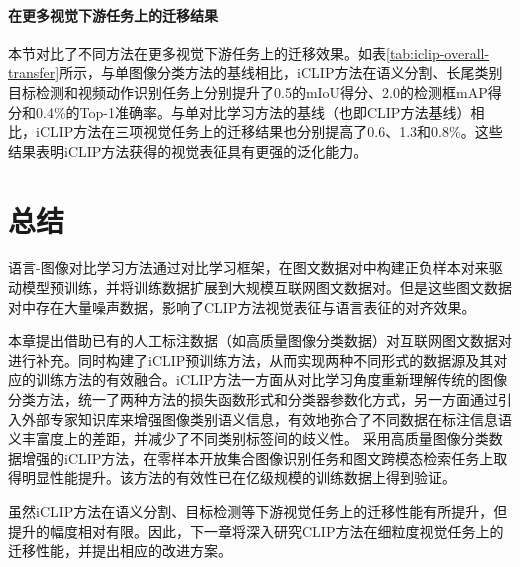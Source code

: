 \paragraph{在更多视觉下游任务上的迁移结果} 本节对比了不同方法在更多视觉下游任务上的迁移效果。如表\ref{tab:iclip-overall-transfer}所示，与单图像分类方法的基线相比，iCLIP方法在语义分割、长尾类别目标检测和视频动作识别任务上分别提升了0.5的mIoU得分、2.0的检测框mAP得分和0.4\%的Top-1准确率。与单对比学习方法的基线（也即CLIP方法基线）相比，iCLIP方法在三项视觉任务上的迁移结果也分别提高了0.6、1.3和0.8\%。这些结果表明iCLIP方法获得的视觉表征具有更强的泛化能力。


\section{总结}
\label{sec:iclip-summary}
语言-图像对比学习方法通过对比学习框架，在图文数据对中构建正负样本对来驱动模型预训练，并将训练数据扩展到大规模互联网图文数据对。但是这些图文数据对中存在大量噪声数据，影响了CLIP方法视觉表征与语言表征的对齐效果。

本章提出借助已有的人工标注数据（如高质量图像分类数据）对互联网图文数据对进行补充。同时构建了iCLIP预训练方法，从而实现两种不同形式的数据源及其对应的训练方法的有效融合。iCLIP方法一方面从对比学习角度重新理解传统的图像分类方法，统一了两种方法的损失函数形式和分类器参数化方式，另一方面通过引入外部专家知识库来增强图像类别语义信息，有效地弥合了不同数据在标注信息语义丰富度上的差距，并减少了不同类别标签间的歧义性。
采用高质量图像分类数据增强的iCLIP方法，在零样本开放集合图像识别任务和图文跨模态检索任务上取得明显性能提升。该方法的有效性已在亿级规模的训练数据上得到验证。

虽然iCLIP方法在语义分割、目标检测等下游视觉任务上的迁移性能有所提升，但提升的幅度相对有限。因此，下一章将深入研究CLIP方法在细粒度视觉任务上的迁移性能，并提出相应的改进方案。